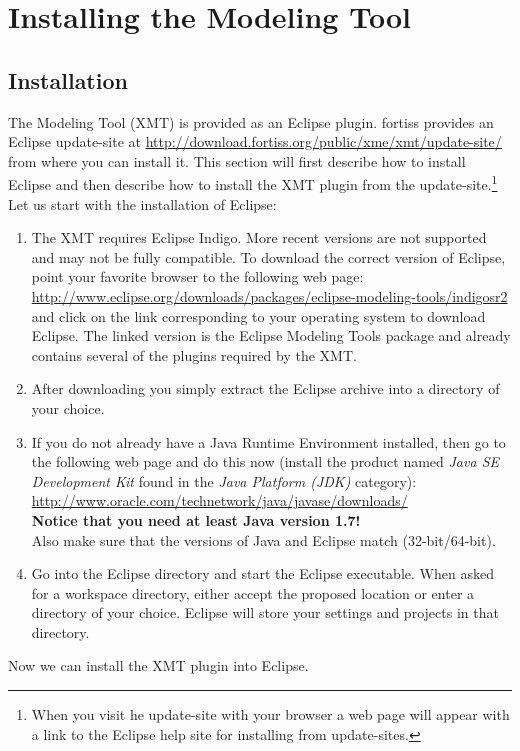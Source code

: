 %
% 
%
%
%

\section{Installing the Modeling Tool}
\label{appx:install_xmt}

\subsection{Installation}

The \xme Modeling Tool (XMT) is provided as an Eclipse plugin.
fortiss provides an Eclipse update-site at \url{http://download.fortiss.org/public/xme/xmt/update-site/} from where you can install it.
This section will first describe how to install Eclipse and then describe how to install the XMT plugin from the update-site.\footnote{%
	When you visit he update-site with your browser a web page will appear with a link to the Eclipse help site for installing from update-sites.
}
%
Let us start with the installation of Eclipse:

\begin{enumerate}
	\item The XMT requires Eclipse Indigo. 
More recent versions are not supported and may not be fully compatible.
To download the correct version of Eclipse,
point your favorite browser to the following web page:\\
\url{http://www.eclipse.org/downloads/packages/eclipse-modeling-tools/indigosr2}\\
and click on the link corresponding to your operating system to download Eclipse.
The linked version is the Eclipse Modeling Tools package and already contains several of the plugins required by the XMT.
	\item After downloading you simply extract the Eclipse archive into a directory of your choice.
	\item If you do not already have a Java Runtime Environment installed, then go to the following web page and do this now
		(install the product named \emph{Java SE Development Kit} found in the \emph{Java Platform (JDK)} category):\\
\url{http://www.oracle.com/technetwork/java/javase/downloads/}\\
		\textbf{Notice that you need at least Java version 1.7!}\\
		Also make sure that the versions of Java and Eclipse match (32-bit/64-bit).
	\item Go into the Eclipse directory and start the Eclipse executable.
		When asked for a workspace directory, either accept the proposed location or enter a directory of your choice.
		Eclipse will store your settings and projects in that directory.
\end{enumerate}
%
Now we can install the XMT plugin into Eclipse.

